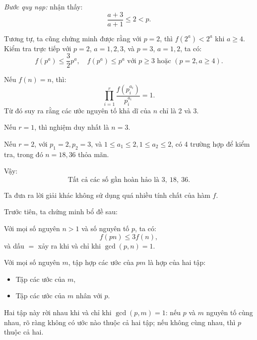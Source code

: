 \begin{problem}
\begin{soln}
\begin{subproof}
        \textit{Bước quy nạp:} nhận thấy:
        \[
            \frac{a+3}{a+1} \le 2 < p.
        \]
    \end{subproof}

    Tương tự, ta cũng chứng minh được rằng với \( p = 2 \), thì \( f(2^a) < 2^a \) khi \( a \ge 4 \).
    Kiểm tra trực tiếp với \( p = 2 \), \( a = 1, 2, 3 \), và \( p = 3 \), \( a = 1, 2 \), ta có:
    \[
        f(p^a) \le \frac{3}{2}p^a, \quad f(p^a) \le p^a \text{ với } p \ge 3 \text{ hoặc } (p = 2, a \ge 4).
    \]

    Nếu \( f(n) = n \), thì:
    \[
        \prod_{i = 1}^r \frac{f(p_i^{a_i})}{p_i^{a_i}} = 1.
    \]
    Từ đó suy ra rằng các ước nguyên tố khả dĩ của \( n \) chỉ là 2 và 3.

    Nếu \( r = 1 \), thì nghiệm duy nhất là \( n = 3 \).

    Nếu \( r = 2 \), với \( p_1 = 2, p_2 = 3 \), và \( 1 \le a_1 \le 2, 1 \le a_2 \le 2 \), có 4 trường hợp để kiểm tra, trong đó \( n = 18, 36 \) thỏa mãn.

    Vậy:
    \[
        \boxed{\text{Tất cả các số gần hoàn hảo là } 3,\ 18,\ 36.}
    \]
\end{soln}

\newpage

\begin{soln}\footnotemark
    Ta đưa ra lời giải khác không sử dụng quá nhiều tính chất của hàm \( f \).

    Trước tiên, ta chứng minh bổ đề sau:
    \begin{lemma*}
        Với mọi số nguyên \( n > 1 \) và số nguyên tố \( p \), ta có:
        \[
            f(pn) \le 3f(n),
        \]
        và dấu $=$ xảy ra khi và chỉ khi \( \gcd(p, n) = 1 \).
    \end{lemma*}
    \begin{subproof}
        Với mọi số nguyên \( m \), tập hợp các ước của \( pm \) là hợp của hai tập:
        \begin{itemize}[topsep=0pt, partopsep=0pt, itemsep=0pt]
            \item Tập các ước của \( m \),
            \item Tập các ước của \( m \) nhân với \( p \).
        \end{itemize}

        Hai tập này rời nhau khi và chỉ khi \( \gcd(p, m) = 1 \): nếu \( p \) và \( m \) nguyên tố cùng nhau, rõ ràng không có ước nào thuộc cả hai tập;
        nếu không cùng nhau, thì \( p \) thuộc cả hai.


\end{subproof}
\end{soln}
\end{problem}

